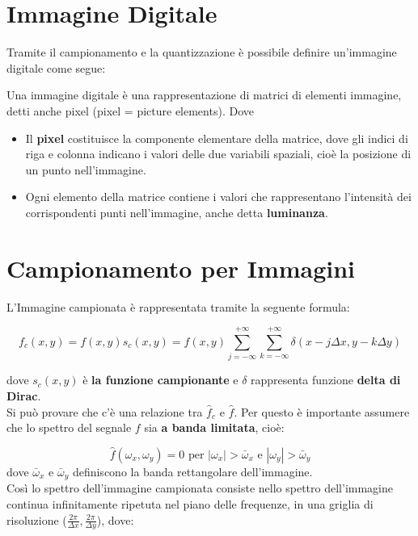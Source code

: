 \section{Immagine Digitale}
Tramite il campionamento e la quantizzazione è possibile definire un'immagine
digitale come segue:
\begin{definition}
    Una immagine digitale è una rappresentazione di matrici di elementi
    immagine, detti anche pixel (pixel = picture elements). Dove

    \begin{itemize}
        \item Il \textbf{pixel} costituisce la componente elementare della
              matrice, dove gli indici di riga e colonna indicano i valori delle
              due variabili spaziali, cioè la posizione di un punto
              nell'immagine.
        \item Ogni elemento della matrice contiene i valori che rappresentano
              l'intensità dei corrispondenti punti nell'immagine, anche detta
              \textbf{luminanza}.
    \end{itemize}
\end{definition}

\section{Campionamento per Immagini}
L'Immagine campionata è rappresentata tramite la seguente formula:

$$
    f_c(x,y) = f(x,y)s_c(x,y)=f(x,y)\sum_{j=-\infty}^{+\infty}
    \sum_{k=-\infty}^{+\infty} \delta (x-j \Delta x, y-k \Delta y)
$$

dove $s_c(x,y)$ è \textbf{la funzione campionante} e $\delta$ rappresenta
funzione \textbf{delta di Dirac}.\\

Si può provare che c'è una relazione tra $\hat{f}_c$ e $\hat{f}$. Per questo è
importante assumere che lo spettro del segnale $f$ sia \textbf{a banda
    limitata}, cioè:

$$
    \hat{f}(\omega_x, \omega_y)=0 \text{ per } |\omega_x| > \bar{\omega}_x \text{ e } |\omega_y| > \bar{\omega}_y
$$
dove $\bar{\omega}_x$ e $\bar{\omega}_y$ definiscono la banda rettangolare
dell'immagine.\\

Così lo spettro dell'immagine campionata consiste nello spettro dell'immagine
continua infinitamente ripetuta nel piano delle frequenze, in una griglia di
risoluzione ($\frac{2\pi}{\Delta x}, \frac{2 \pi}{\Delta y}$), dove:

